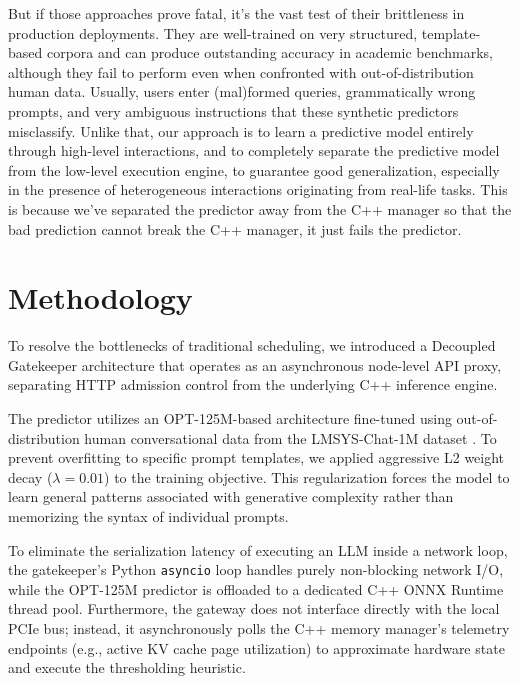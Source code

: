 \documentclass[conference]{IEEEtran}
\begin{document}
But if those approaches prove fatal, it's the vast test of their brittleness in production deployments. They are well-trained on very structured, template-based corpora and can produce outstanding accuracy in academic benchmarks, although they fail to perform even when confronted with out-of-distribution human data. Usually, users enter (mal)formed queries, grammatically wrong prompts, and very ambiguous instructions that these synthetic predictors misclassify. Unlike that, our approach is to learn a predictive model entirely through high-level interactions, and to completely separate the predictive model from the low-level execution engine, to guarantee good generalization, especially in the presence of heterogeneous interactions \cite{b2} originating from real-life tasks. This is because we've separated the predictor away from the C++ manager so that the bad prediction cannot break the C++ manager, it just fails the predictor.


\section{Methodology}
To resolve the bottlenecks of traditional scheduling, we introduced a Decoupled Gatekeeper architecture that operates as an asynchronous node-level API proxy, separating HTTP admission control from the underlying C++ inference engine. 

The predictor utilizes an OPT-125M-based architecture fine-tuned using out-of-distribution human conversational data from the LMSYS-Chat-1M dataset \cite{b2}. To prevent overfitting to specific prompt templates, we applied aggressive L2 weight decay ($\lambda = 0.01$) to the training objective. This regularization forces the model to learn general patterns associated with generative complexity rather than memorizing the syntax of individual prompts. 

To eliminate the serialization latency of executing an LLM inside a network loop, the gatekeeper's Python \texttt{asyncio} loop handles purely non-blocking network I/O, while the OPT-125M predictor is offloaded to a dedicated C++ ONNX Runtime thread pool. Furthermore, the gateway does not interface directly with the local PCIe bus; instead, it asynchronously polls the C++ memory manager's telemetry endpoints (e.g., active KV cache page utilization) to approximate hardware state and execute the thresholding heuristic.
\end{document}
